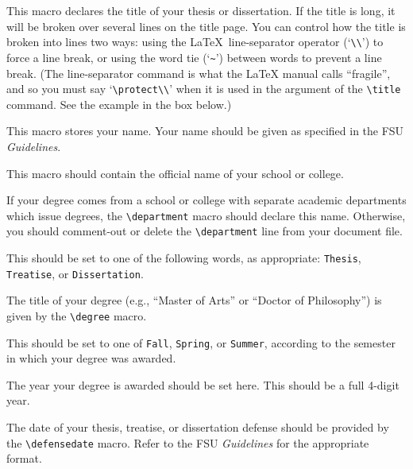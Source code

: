 \documentclass[11pt,letterpaper]{ltxdockit}[2011/03/25]
\newcommand*{\booktitle}[1]{\textit{#1}}
\newcommand*{\complit}[1]{\texttt{#1}}
\renewcommand{\-}{\discretionary{}{}{}}
\newenvironment*{macrolist}
  {\list{}{%
      \setlength{\labelwidth}{1.5in}
      \setlength{\labelsep}{10pt}
      \setlength{\leftmargin}{0pt}
      \setlength{\parsep}{0pt}
      \setlength{\listparindent}{\parindent}
      \renewcommand*{\makelabel}[1]{{\setbox0=\hbox{\parbox[t]{1.5in}{\raggedleft\leavevmode\marglistfont##1}}\dp0=0pt\box0}}}}
  {\endlist}
\def\cmditem#1{\cmd{#1}\\}
\def\macroitems#1{\item[\listofitems{\cmditem}{#1}]}
\begin{document}
\begin{macrolist}
\macroitems{title}
This macro declares the title of your
thesis or dissertation.  If the title is long, it will be broken over
several lines on the title page.  You can control how the title
is broken into lines two ways:
using the \LaTeX\ line-separator operator (`\verb+\\+') to force
a line break, or using the word tie (`\verb+~+') between words
to prevent a line break.  (The line-separator command is what the
\LaTeX{} manual calls ``fragile'', and so you must say
`\verb+\protect\\+' when it is used in the argument of the
\verb|\title| command. See the example in the box below.)

\macroitems{author}
This macro stores your name.  Your name
should be given as specified in the FSU \booktitle{Guidelines}.

\macroitems{college}
This macro should contain the official name of your
school or college.

\macroitems{department}
If your degree comes from a school or college with separate academic
departments which issue degrees,
the \verb|\department| macro should declare this name.  Otherwise, you
should comment-out or delete the \verb|\department| line from your
document file.

\macroitems{manuscripttype}
This should be set to one of the following words, as
appropriate:
\complit{Thesis}, \complit{Treatise}, or \complit{Dissertation}.

\macroitems{degree}
The title of your degree (e.g., ``Master
of Arts'' or ``Doctor of Philosophy'') is given by the \verb|\degree|
macro.

\macroitems{semester}
This should be set to one of
\complit{Fall}, \complit{Spring}, or \complit{Summer}, according to
the semester in which your degree was awarded.

\macroitems{degreeyear}
The year your degree is awarded
should be set here.  This should be a full 4-digit year.

\macroitems{defensedate}
The date of your thesis,
treatise, or dissertation defense should be provided by the
\verb|\defensedate| macro.  Refer to the FSU \booktitle{Guidelines}
for the appropriate format.

\end{macrolist}
\end{document}
